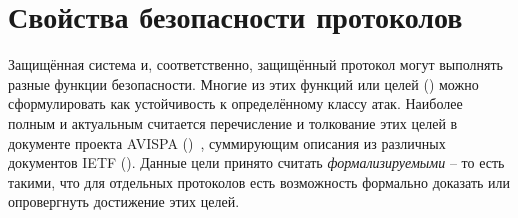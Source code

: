 \section{Свойства безопасности протоколов}
Защищённая система и, соответственно, защищённый протокол могут выполнять разные функции безопасности. Многие из этих функций или целей () можно сформулировать как устойчивость к определённому классу атак. Наиболее полным и актуальным считается перечисление и толкование этих целей в документе проекта AVISPA ()~\cite{AVISPA:2003}, суммирующим описания из различных документов IETF (). Данные цели принято считать \emph{формализируемыми} -- то есть такими, что для отдельных протоколов есть возможность формально доказать или опровергнуть достижение этих целей.

